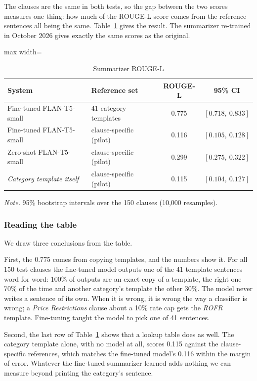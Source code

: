 The clauses are the same in both tests, so the gap between the two scores measures one thing: how much of the ROUGE-L score comes from the reference sentences all being the same. Table~\ref{tab:sumeval} gives the result. The summarizer re-trained in October 2026 gives exactly the same scores as the original.

\begin{table}[!htbp]
\centering
\caption{Summarizer ROUGE-L}
\label{tab:sumeval}
\small
\begin{adjustbox}{max width=\textwidth}
\begin{tabular}{llcc}
\toprule
\textbf{System} & \textbf{Reference set} & \textbf{ROUGE-L} & \textbf{95\% CI}\\
\midrule
Fine-tuned FLAN-T5-small & 41 category templates    & 0.775 & $[0.718,\ 0.833]$\\
Fine-tuned FLAN-T5-small & clause-specific (pilot)  & 0.116 & $[0.105,\ 0.128]$\\
Zero-shot FLAN-T5-small  & clause-specific (pilot)  & 0.299 & $[0.275,\ 0.322]$\\
\midrule
\emph{Category template itself} & clause-specific (pilot) & 0.115 & $[0.104,\ 0.127]$\\
\bottomrule
\end{tabular}
\end{adjustbox}

{\footnotesize\singlespacing \emph{Note.} 95\% bootstrap intervals over the 150 clauses (10{,}000 resamples).\par}
\end{table}

\subsubsection{Reading the table}
We draw three conclusions from the table.

First, the 0.775 comes from copying templates, and the numbers show it. For all 150 test clauses the fine-tuned model outputs one of the 41 template sentences word for word: 100\% of outputs are an exact copy of a template, the right one 70\% of the time and another category's template the other 30\%. The model never writes a sentence of its own. When it is wrong, it is wrong the way a classifier is wrong; a \emph{Price Restrictions} clause about a 10\% rate cap gets the \emph{ROFR} template. Fine-tuning taught the model to pick one of 41 sentences.

Second, the last row of Table~\ref{tab:sumeval} shows that a lookup table does as well. The category template alone, with no model at all, scores 0.115 against the clause-specific references, which matches the fine-tuned model's 0.116 within the margin of error. Whatever the fine-tuned summarizer learned adds nothing we can measure beyond printing the category's sentence.

